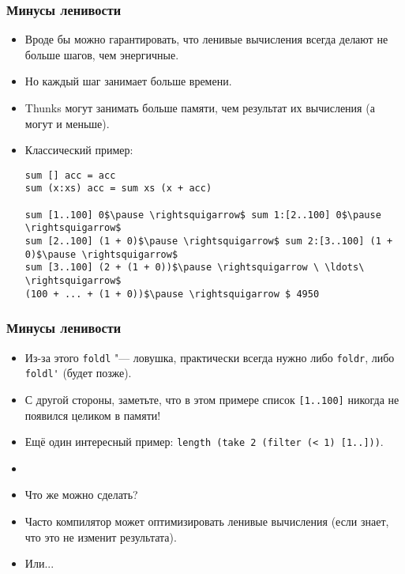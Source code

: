\documentclass[11pt]{beamer}
\begin{document}
\begin{frame}[fragile]
  \frametitle{Минусы ленивости}
  \begin{itemize}
    \item Вроде бы можно гарантировать, что ленивые вычисления всегда делают не больше шагов, чем энергичные.
    \item Но каждый шаг занимает больше времени.
    \item Thunks могут занимать больше памяти, чем результат их вычисления (а могут и меньше).
    \item Классический пример:
          \begin{lstlisting}[basicstyle=\ttfamily\small,mathescape]
sum [] acc = acc
sum (x:xs) acc = sum xs (x + acc)

sum [1..100] 0$\pause \rightsquigarrow$ sum 1:[2..100] 0$\pause \rightsquigarrow$
sum [2..100] (1 + 0)$\pause \rightsquigarrow$ sum 2:[3..100] (1 + 0)$\pause \rightsquigarrow$
sum [3..100] (2 + (1 + 0))$\pause \rightsquigarrow \ \ldots\ \rightsquigarrow$
(100 + ... + (1 + 0))$\pause \rightsquigarrow $ 4950
\end{lstlisting}
  \end{itemize}
\end{frame}

\begin{frame}[fragile]
  \frametitle{Минусы ленивости}
  \begin{itemize}
    \item Из-за этого \lstinline|foldl| "--- ловушка, практически всегда нужно либо \lstinline|foldr|, либо \lstinline|foldl'| (будет позже).
          \pause
    \item С другой стороны, заметьте, что в этом примере список \lstinline|[1..100]| никогда не появился целиком в памяти!
          \pause
    \item Ещё один интересный пример: \lstinline|length (take 2 (filter (< 1) [1..]))|.
    \item[]
      \pause
    \item Что же можно сделать?
          \pause
    \item Часто компилятор может оптимизировать ленивые вычисления (если знает, что это не изменит результата).
    \item Или...
  \end{itemize}
\end{frame}
\end{document}
